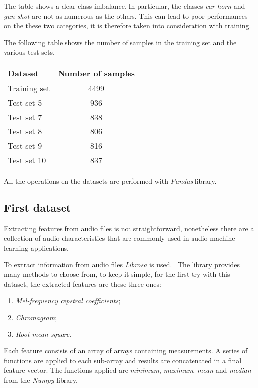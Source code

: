 The table shows a clear class imbalance. In particular, the classes 
\emph{car horn} and \emph{gun shot} are not as numerous as the others. 
This can lead to poor performances on the these two categories, it is
therefore taken 
into consideration with training. 

The following table shows the number of samples in the training set and 
the various test sets.

\begin{center}
    \begin{tabular}{ |l|c| } 
        \hline
        Dataset & Number of samples \\
        \hline
        Training set & 4499 \\
        Test set 5 & 936 \\
        Test set 7 & 838 \\
        Test set 8 & 806 \\
        Test set 9 & 816 \\
        Test set 10 & 837 \\
        \hline
    \end{tabular}
\end{center}
All the operations on the datasets are performed with \emph{Pandas} library.~\cite{pandas}

\subsection{First dataset}
Extracting features from audio files is not straightforward, nonetheless there 
are a collection of audio characteristics that are commonly used in audio machine learning 
applications.~\cite{features}

To extract information from audio files \emph{Librosa} is used.~\cite{librosa}
The library provides many methods to choose from,
to keep it simple, for the first try with this dataset, the extracted features 
are these three ones: 
\begin{enumerate}
    \item \emph{Mel-frequency cepstral coefficients};
    \item \emph{Chromagram};
    \item \emph{Root-mean-square}.
\end{enumerate}
Each feature consists of an array of arrays containing measurements. 
A series of functions are applied to each sub-array and results 
are concatenated in a final feature vector. 
The functions applied are \emph{minimum}, \emph{maximum}, \emph{mean} 
and \emph{median} from the \emph{Numpy} library.~\cite{numpy}

